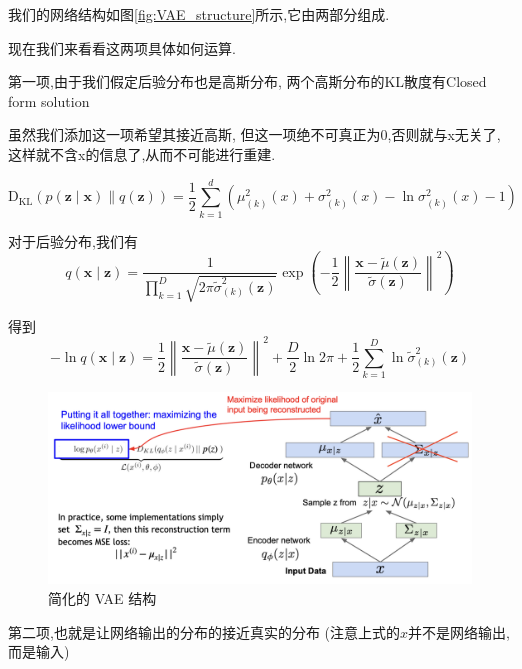 	我们的网络结构如图\ref{fig:VAE_structure}所示,它由两部分组成.

	现在我们来看看这两项具体如何运算.
	
	第一项,由于我们假定后验分布也是高斯分布,
	两个高斯分布的KL散度有Closed form solution

	虽然我们添加这一项希望其接近高斯,
	但这一项绝不可真正为0,否则就与x无关了,这样就不含x的信息了,从而不可能进行重建.
	
	\begin{equation}
		\operatorname{D_{KL}}(p(\bm z \mid \bm x) \| q(\bm z))=\frac{1}{2} \sum_{k=1}^{d}\left(\mu_{(k)}^{2}(x)+\sigma_{(k)}^{2}(x)-\ln \sigma_{(k)}^{2}(x)-1\right)
	\end{equation}
	
	对于后验分布,我们有
	\begin{equation}
		q(\bm x \mid \bm z)=\frac{1}{\prod_{k=1}^{D} \sqrt{2 \pi \tilde{\sigma}_{(k)}^{2}(\bm z)}} \exp \left(-\frac{1}{2}\left\|\frac{\bm x-\tilde{\mu}(\bm z)}{\tilde{\sigma}(\bm z)}\right\|^{2}\right)
	\end{equation}

	得到
	\begin{equation}
		-\ln q(\bm x \mid \bm z)=\frac{1}{2}\left\|\frac{\bm x-\tilde{\mu}(\bm z)}{\tilde{\sigma}(\bm z)}\right\|^{2}+\frac{D}{2} \ln 2 \pi+\frac{1}{2} \sum_{k=1}^{D} \ln \tilde{\sigma}_{(k)}^{2}(\bm z)
	\end{equation}

	\begin{figure}[htbp]
		\centering
		\includegraphics[scale=0.3]{figures/simple_VAE.png}
		\caption{简化的 VAE 结构}
		\label{fig:simple_VAE}
	\end{figure}

	第二项,也就是让网络输出的分布的接近真实的分布
	(注意上式的$x$并不是网络输出,而是输入)
	

